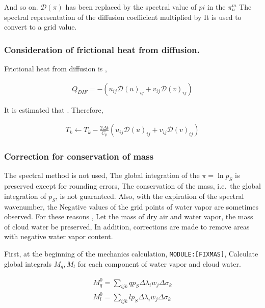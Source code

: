 And so on. \({\mathcal D}(\pi)\) has been replaced by the spectral value
of \(pi\) in the \(\pi_n^m\) The spectral representation of the
diffusion coefficient multiplied by It is used to convert to a grid
value.

\hypertarget{consideration-of-frictional-heat-from-diffusion.}{%
\subsubsection{Consideration of frictional heat from
diffusion.}\label{consideration-of-frictional-heat-from-diffusion.}}

Frictional heat from diffusion is ,

\begin{eqnarray}
  Q_{DIF} = - \left( u_{ij} {\mathcal D}(u)_{ij}
                   + v_{ij} {\mathcal D}(v)_{ij} \right)
\end{eqnarray}

It is estimated that . Therefore,

\begin{eqnarray}
  T_k \leftarrow  T_k
       -  \frac{2 \Delta t}{C_p}
           \left( u_{ij} {\mathcal D}(u)_{ij}
                 + v_{ij} {\mathcal D}(v)_{ij} \right)
\end{eqnarray}

\hypertarget{correction-for-conservation-of-mass}{%
\subsubsection{Correction for conservation of
mass}\label{correction-for-conservation-of-mass}}

The spectral method is not used, The global integration of the
\(\pi = \ln p_S\) is preserved except for rounding errors, The
conservation of the mass, i.e.~the global integration of \(p_S\), is not
guaranteed. Also, with the expiration of the spectral wavenumber, the
Negative values of the grid points of water vapor are sometimes
observed. For these reasons , Let the mass of dry air and water vapor,
the mass of cloud water be preserved, In addition, corrections are made
to remove areas with negative water vapor content.

First, at the beginning of the mechanics calculation,
\texttt{MODULE:{[}FIXMAS{]}}, Calculate global integrals \(M_q, M_l\)
for each component of water vapor and cloud water.

\begin{eqnarray}
  M_q^0  =  \sum_{ijk} q p_S  \Delta\lambda_i w_j \Delta\sigma_k  \\
  M_l^0  =  \sum_{ijk} l p_S  \Delta\lambda_i w_j \Delta\sigma_k
\end{eqnarray}

